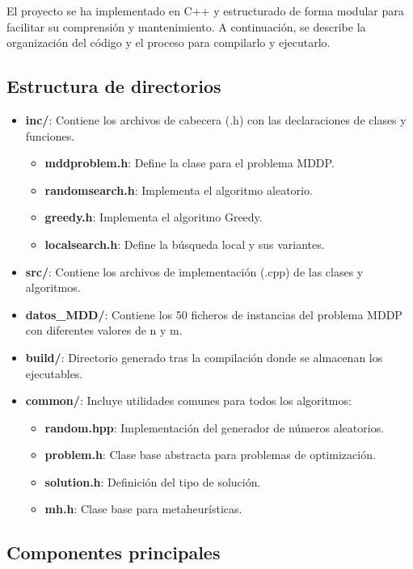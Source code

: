 \documentclass{article}
\begin{document}
El proyecto se ha implementado en C++ y estructurado de forma modular para facilitar su comprensión y mantenimiento. A continuación, se describe la organización del código y el proceso para compilarlo y ejecutarlo.

\subsection{Estructura de directorios}

\begin{itemize}
    \item \textbf{inc/}: Contiene los archivos de cabecera (.h) con las declaraciones de clases y funciones.
        \begin{itemize}
            \item \textbf{mddproblem.h}: Define la clase para el problema MDDP.
            \item \textbf{randomsearch.h}: Implementa el algoritmo aleatorio.
            \item \textbf{greedy.h}: Implementa el algoritmo Greedy.
            \item \textbf{localsearch.h}: Define la búsqueda local y sus variantes.
        \end{itemize}
    \item \textbf{src/}: Contiene los archivos de implementación (.cpp) de las clases y algoritmos.
    \item \textbf{datos\_MDD/}: Contiene los 50 ficheros de instancias del problema MDDP con diferentes valores de n y m.
    \item \textbf{build/}: Directorio generado tras la compilación donde se almacenan los ejecutables.
    \item \textbf{common/}: Incluye utilidades comunes para todos los algoritmos:
        \begin{itemize}
            \item \textbf{random.hpp}: Implementación del generador de números aleatorios.
            \item \textbf{problem.h}: Clase base abstracta para problemas de optimización.
            \item \textbf{solution.h}: Definición del tipo de solución.
            \item \textbf{mh.h}: Clase base para metaheurísticas.
        \end{itemize}
\end{itemize}

\subsection{Componentes principales}
\end{document}
